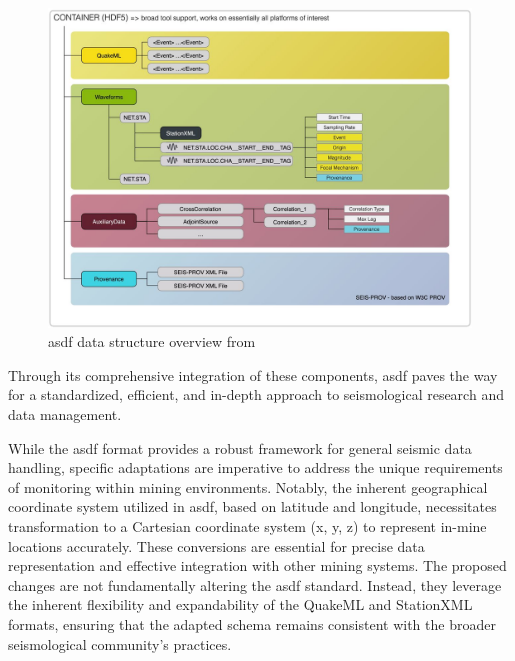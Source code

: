 \begin{figure}
    \centering
    \includegraphics[width=\textwidth]{ASDF_Format_overview.jpeg}
    \caption{\gls{asdf} data structure overview from \citet{krischer2016asdf}}
    \label{fig:asdf_data_format}
\end{figure}

Through its comprehensive integration of these components, \gls{asdf} paves the way for a standardized, efficient, and in-depth approach to seismological research and data management.

While the \gls{asdf} format provides a robust framework for general seismic data handling, specific adaptations are imperative to address the unique requirements of \museismic monitoring within mining environments. Notably, the inherent geographical coordinate system utilized in \gls{asdf}, based on latitude and longitude, necessitates transformation to a Cartesian coordinate system (x, y, z) to represent in-mine locations accurately. These conversions are essential for precise data representation and effective integration with other mining systems. The proposed changes are not fundamentally altering the \gls{asdf} standard. Instead, they leverage the inherent flexibility and expandability of the QuakeML and StationXML formats, ensuring that the adapted schema remains consistent with the broader seismological community's practices.

